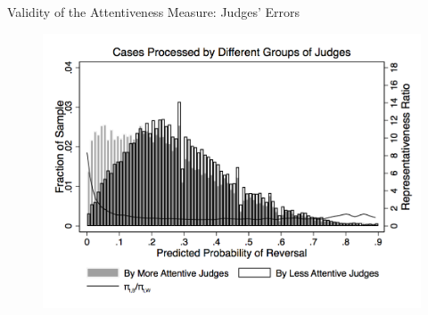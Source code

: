 \begin{frame}{Validity of the Attentiveness Measure: Judges' Errors}
    \begin{figure}
        \centering
        \includegraphics[height = 0.7 \textheight]{images/dist.png}
    \end{figure}
\end{frame}

